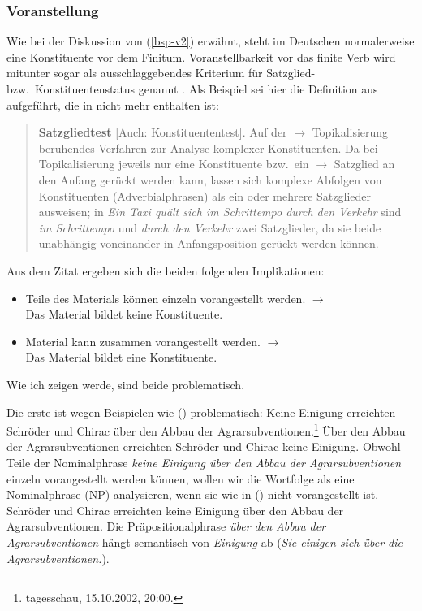 



\subsubsection{Voranstellung}
\label{sec-konst-test-probleme-voranstellung} 

Wie bei der Diskussion von (\ref{bsp-v2}) erwähnt, steht im Deutschen normalerweise
eine Konstituente vor dem Finitum. Voranstellbarkeit vor das finite Verb wird mitunter
sogar als ausschlaggebendes Kriterium für Satzglied- bzw.\ Konstituentenstatus genannt \citep[]{Duden2005}. Als Beispiel sei hier die Definition aus  aufgeführt, die in
 nicht mehr enthalten ist:
\begin{quote}
\textbf{Satzgliedtest} [Auch: Konstituententest]. Auf der $\to$ Topikalisierung
beruhendes Verfahren zur Analyse komplexer Konstituenten. Da bei Topikalisierung
jeweils nur eine Konstituente bzw.\ ein $\to$ Satzglied an den Anfang gerückt werden kann,
lassen sich komplexe Abfolgen von Konstituenten (\zb Adverbialphrasen) als
ein oder mehrere Satzglieder ausweisen; in \textit{Ein Taxi quält sich im Schrittempo
durch den Verkehr} sind \textit{im Schrittempo} und \textit{durch den Verkehr}
zwei Satzglieder, da sie beide unabhängig voneinander in Anfangsposition gerückt werden
können. \citep[]{Bussmann83a}
\end{quote}

Aus dem Zitat ergeben sich die beiden folgenden Implikationen:
\begin{itemize}
\item Teile des Materials können einzeln vorangestellt werden. $\to$\\
      Das Material bildet keine Konstituente.
\item Material kann zusammen vorangestellt werden. $\to$\\
      Das Material bildet eine Konstituente.
\end{itemize}
Wie ich zeigen werde, sind beide problematisch.

Die erste ist wegen Beispielen wie () problematisch:
\eal
\ex Keine Einigung erreichten Schröder und Chirac über den Abbau der Agrarsubventionen.\footnote{tagesschau, 15.10.2002, 20:00.}
\ex Über den Abbau der Agrarsubventionen erreichten Schröder und Chirac keine Einigung.
\zl
Obwohl Teile der Nominalphrase \emph{keine Einigung über den Abbau der Agrarsubventionen}
einzeln vorangestellt werden können, wollen wir die Wortfolge als eine Nominalphrase (NP) analysieren,
wenn sie wie in () nicht vorangestellt ist.
\ea
Schröder und Chirac erreichten keine Einigung über den Abbau der Agrarsubventionen.
\z
Die Präpositionalphrase \emph{über den Abbau der Agrarsubventionen} hängt semantisch von \emph{Einigung}
ab (\emph{Sie einigen sich über die Agrarsubventionen.}).

